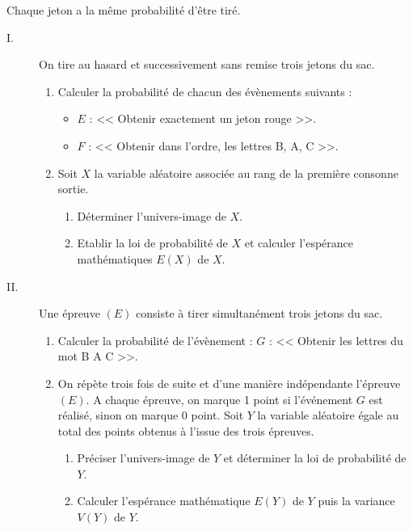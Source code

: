       Chaque jeton a la m\^eme probabilit\'e d'\^etre tir\'e.
      \begin{description}
            \item[I. ]
                  On tire au hasard et successivement sans remise trois jetons du sac.
                  \begin{enumerate}
                        \item Calculer la probabilit\'e de chacun des \'ev\`enements suivants :
                              \begin{itemize}
                                    \item $E$ : << Obtenir exactement un jeton rouge >>.
                                    \item $F$ : << Obtenir dans l'ordre, les lettres B, A, C >>.
                              \end{itemize}
                        \item Soit $X$ la variable al\'eatoire associ\'ee au rang de la premi\`ere consonne sortie.
                              \begin{enumerate}
                                    \item D\'eterminer l'univers-image de $X$.
                                    \item Etablir la loi de probabilit\'e de $X$ et calculer 
                                          l'esp\'erance math\'ematiques $E(X)$ de $X$.
                              \end{enumerate}
                  \end{enumerate}
            \item[II. ]
                  Une \'epreuve $(E)$ consiste \`a tirer simultan\'ement trois jetons du sac.
                  \begin{enumerate}
                        \item Calculer la probabilit\'e de l'\'ev\`enement : 
                              $G$ : << Obtenir les lettres du mot  B A C >>.
                        \item On répète trois fois de suite et d’une manière indépendante l’épreuve$(E)$.
                              A chaque épreuve, on marque 1 point si l’événement $G$ est réalisé, sinon on marque 0 point.
                              Soit $Y$ la variable aléatoire égale au total des points obtenus à l’issue des trois épreuves.
                              \begin{enumerate}
                                    \item Préciser l'univers-image de $Y$ et déterminer la loi de probabilité de $Y$.
                                    \item Calculer l'espérance mathématique $E(Y)$ de $Y$ puis la variance $V(Y)$ de $Y$. 
                              \end{enumerate}
                  \end{enumerate}
      \end{description}
